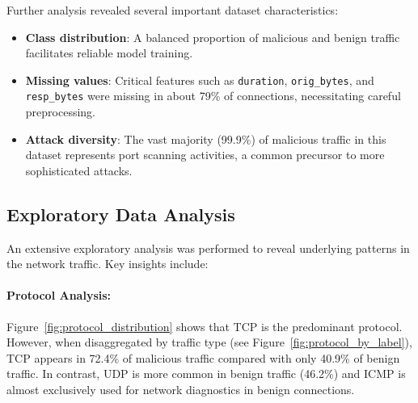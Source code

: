 Further analysis revealed several important dataset characteristics:
\begin{itemize}
    \item \textbf{Class distribution}: A balanced proportion of malicious and benign traffic facilitates reliable model training.
    \item \textbf{Missing values}: Critical features such as \texttt{duration}, \texttt{orig\_bytes}, and \texttt{resp\_bytes} were missing in about 79\% of connections, necessitating careful preprocessing.
    \item \textbf{Attack diversity}: The vast majority (99.9\%) of malicious traffic in this dataset represents port scanning activities, a common precursor to more sophisticated attacks.
\end{itemize}

\subsection{Exploratory Data Analysis}

An extensive exploratory analysis was performed to reveal underlying patterns in the network traffic. Key insights include:

\paragraph{Protocol Analysis:}  
Figure~\ref{fig:protocol_distribution} shows that TCP is the predominant protocol. However, when disaggregated by traffic type (see Figure~\ref{fig:protocol_by_label}), TCP appears in 72.4\% of malicious traffic compared with only 40.9\% of benign traffic. In contrast, UDP is more common in benign traffic (46.2\%) and ICMP is almost exclusively used for network diagnostics in benign connections.

